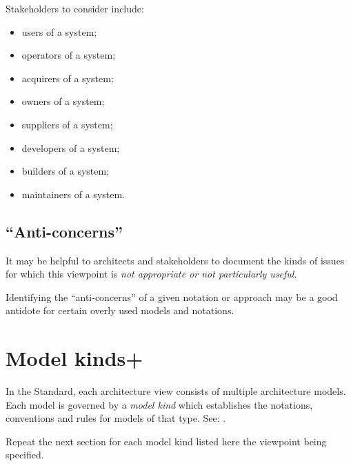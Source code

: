 Stakeholders to consider include:
\begin{itemize}
\item users of a system; 
\item operators of a system; 
\item acquirers of a system;
\item owners of a system; 
\item suppliers of a system; 
\item developers of a system; 
\item builders of a system; 
\item maintainers of a system.
\end{itemize}

\subsection{``Anti-concerns'' \Optional} 

It may be helpful to architects and stakeholders to
document the kinds of issues for which this viewpoint is \emph{not
  appropriate or not particularly useful}.

Identifying the ``anti-concerns'' of a given notation or approach may
be a good antidote for certain overly used models and notations.




\section{Model kinds+}\label{mk:list}


In the Standard, each architecture view consists of multiple
architecture models. Each model is governed by a \textit{model kind}
which establishes the notations, conventions and rules for models of
that type.  See: .

Repeat the next section for each model kind listed here the viewpoint
being specified.


\section{}\label{vp:mk}



